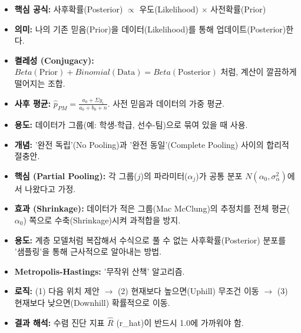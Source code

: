 \documentclass[11pt,a4paper]{book}
\theoremstyle{definition}
\begin{document}
\begin{tcolorbox}[breakable, title={베이지안 추론 (Bayesian Inference)}]
\begin{itemize}
    \item \textbf{핵심 공식:} 사후확률(Posterior) $\propto$ 우도(Likelihood) $\times$ 사전확률(Prior)
    \item \textbf{의미:} 나의 기존 믿음(Prior)을 데이터(Likelihood)를 통해 업데이트(Posterior)한다.
    \item \textbf{켤레성 (Conjugacy):} $Beta(\text{Prior}) + Binomial(\text{Data}) = Beta(\text{Posterior})$ 처럼, 계산이 깔끔하게 떨어지는 조합.
    \item \textbf{사후 평균:} $\hat{p}_{PM} = \frac{a_0 + \Sigma y_i}{a_0 + b_0 + n}$. 사전 믿음과 데이터의 가중 평균.
\end{itemize}
\end{tcolorbox}

\begin{tcolorbox}[breakable, title={계층 모델 (Hierarchical Model)}]
\begin{itemize}
    \item \textbf{용도:} 데이터가 그룹(예: 학생-학급, 선수-팀)으로 묶여 있을 때 사용.
    \item \textbf{개념:} '완전 독립'(No Pooling)과 '완전 동일'(Complete Pooling) 사이의 합리적 절충안.
    \item \textbf{핵심 (Partial Pooling):} 각 그룹($j$)의 파라미터($\alpha_j$)가 공통 분포 $N(\alpha_0, \sigma_{\alpha}^2)$에서 나왔다고 가정.
    \item \textbf{효과 (Shrinkage):} 데이터가 적은 그룹(Mac McClung)의 추정치를 전체 평균($\alpha_0$) 쪽으로 수축(Shrinkage)시켜 과적합을 방지.
\end{itemize}
\end{tcolorbox}

\begin{tcolorbox}[breakable, title={MCMC (Markov Chain Monte Carlo)}]
\begin{itemize}
    \item \textbf{용도:} 계층 모델처럼 복잡해서 수식으로 풀 수 없는 사후확률(Posterior) 분포를 '샘플링'을 통해 근사적으로 알아내는 방법.
    \item \textbf{Metropolis-Hastings:} '무작위 산책' 알고리즘.
    \item \textbf{로직:} (1) 다음 위치 제안 $\rightarrow$ (2) 현재보다 높으면(Uphill) 무조건 이동 $\rightarrow$ (3) 현재보다 낮으면(Downhill) 확률적으로 이동.
    \item \textbf{결과 해석:} 수렴 진단 지표 $\hat{R}$ (r\_hat)이 반드시 1.0에 가까워야 함.
\end{itemize}
\end{tcolorbox}
\end{document}
